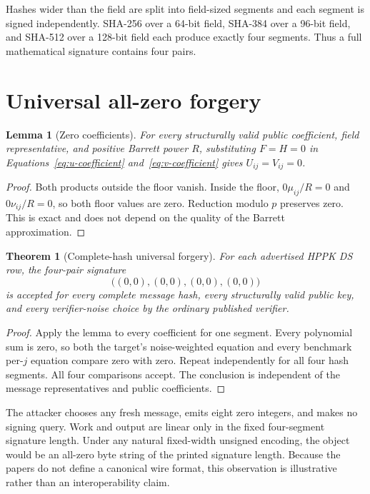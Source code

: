 \documentclass[10pt,a4paper]{article}
\newtheorem{theorem}{Theorem}
\newtheorem{lemma}{Lemma}
\begin{document}
Hashes wider than the field are split into field-sized segments and each
segment is signed independently. SHA-256 over a 64-bit field, SHA-384 over a
96-bit field, and SHA-512 over a 128-bit field each produce exactly four
segments. Thus a full mathematical signature contains four pairs.

\section{Universal all-zero forgery}

\begin{lemma}[Zero coefficients]
For every structurally valid public coefficient, field representative, and
positive Barrett power $R$, substituting $F=H=0$ in
Equations~\eqref{eq:u-coefficient} and~\eqref{eq:v-coefficient} gives
$U_{ij}=V_{ij}=0$.
\end{lemma}

\begin{proof}
Both products outside the floor vanish. Inside the floor,
$0\mu_{ij}/R=0$ and $0\nu_{ij}/R=0$, so both floor values are zero. Reduction
modulo $p$ preserves zero. This is exact and does not depend on the quality of
the Barrett approximation.
\end{proof}

\begin{theorem}[Complete-hash universal forgery]
For each advertised HPPK DS row, the four-pair signature
\[
 \bigl((0,0),(0,0),(0,0),(0,0)\bigr)
\]
is accepted for every complete message hash, every structurally valid public
key, and every verifier-noise choice by the ordinary published verifier.
\end{theorem}

\begin{proof}
Apply the lemma to every coefficient for one segment. Every polynomial sum is
zero, so both the target's noise-weighted equation and every benchmark
per-$j$ equation compare zero with zero. Repeat independently for all four
hash segments. All four comparisons accept. The conclusion is independent of
the message representatives and public coefficients.
\end{proof}

The attacker chooses any fresh message, emits eight zero integers, and makes
no signing query. Work and output are linear only in the fixed four-segment
signature length. Under any natural fixed-width unsigned encoding, the object
would be an all-zero byte string of the printed signature length. Because the
papers do not define a canonical wire format, this observation is illustrative
rather than an interoperability claim.
\end{document}
